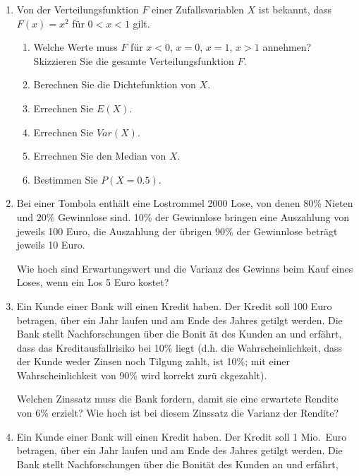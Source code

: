 \begin{enumerate}
\item Von der Verteilungsfunktion $F$ einer Zufallsvariablen $X$ ist
bekannt, dass $F(x)=x^{2}$ f\"{u}r $0<x<1$ gilt.
\begin{enumerate}
\item Welche Werte muss $F$ f\"{u}r $x<0$, $x=0$, $x=1$, $x>1$ annehmen?
Skizzieren Sie die gesamte Verteilungsfunktion $F$.
\item Berechnen Sie die Dichtefunktion von $X$.
\item Errechnen Sie $E(X)$.
\item Errechnen Sie $Var(X)$.
\item Errechnen Sie den Median von $X$.
\item Bestimmen Sie $P(X=0.5)$.
\end{enumerate}

\item Bei einer Tombola enth\"{a}lt eine Lostrommel 2000 Lose, von denen
80\% Nieten und 20\% Gewinnlose sind. 10\% der Gewinnlose bringen eine
Auszahlung von jeweils 100 Euro, die Auszahlung der \"{u}brigen 90\% der
Gewinnlose betr\"{a}gt jeweils 10 Euro.

Wie hoch sind Erwartungswert und die Varianz des Gewinns beim Kauf eines
Loses, wenn ein Los 5 Euro kostet?

\item Ein Kunde einer Bank will einen Kredit haben. Der Kredit soll
100 Euro betragen, \"{u}ber ein Jahr laufen und am Ende des
Jahres getilgt werden. Die Bank stellt Nachforschungen \"{u}ber die Bonit%
\"{a}t des Kunden an und erf\"{a}hrt, dass das Kreditausfallrisiko bei 10\%
liegt (d.h. die Wahrscheinlichkeit, dass der Kunde weder Zinsen noch Tilgung
zahlt, ist 10\%; mit einer Wahrscheinlichkeit von 90\% wird korrekt zur\"{u}%
ckgezahlt).

Welchen Zinssatz muss die Bank fordern, damit sie eine erwartete Rendite von
6\% erzielt? Wie hoch ist bei diesem Zinssatz die Varianz der Rendite?

\item Ein Kunde einer Bank will einen Kredit haben. Der Kredit soll 1 Mio.\
Euro betragen, \"{u}ber ein Jahr laufen und am Ende des Jahres getilgt
werden. Die Bank stellt Nachforschungen \"{u}ber die Bonit\"{a}t des Kunden
an und erf\"{a}hrt,


\end{enumerate}
